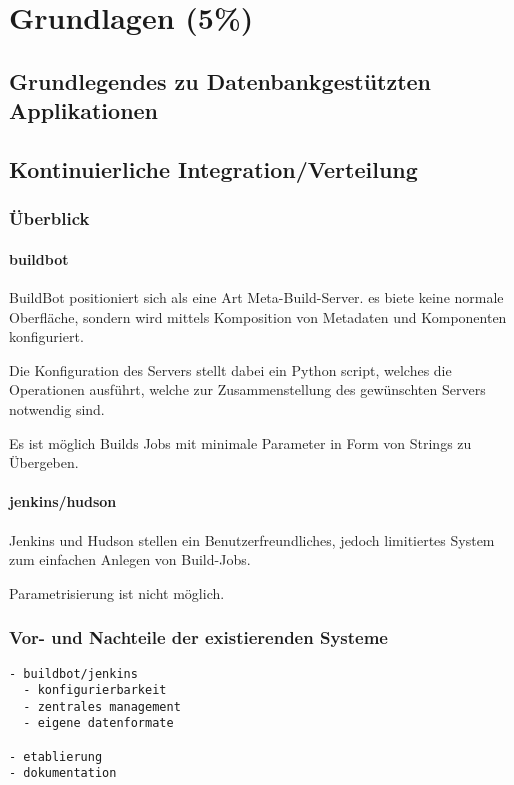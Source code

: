 \chapter{Grundlagen (5\%)}

\section{Grundlegendes zu Datenbankgest\"utzten Applikationen}
\section{Kontinuierliche Integration/Verteilung}

\subsection{Überblick}

\subsubsection{buildbot}

BuildBot positioniert sich als eine Art Meta-Build-Server.
es biete keine normale Oberfläche, sondern wird mittels
Komposition von Metadaten und Komponenten konfiguriert.

Die Konfiguration des Servers stellt dabei ein Python script,
welches die Operationen ausführt, welche zur Zusammenstellung des gewünschten Servers notwendig sind.

Es ist möglich Builds Jobs mit minimale Parameter in Form von Strings zu Übergeben.

\subsubsection{jenkins/hudson}

Jenkins und Hudson stellen ein Benutzerfreundliches,
jedoch limitiertes System zum einfachen Anlegen von Build-Jobs.

Parametrisierung ist nicht möglich.

\subsection{Vor- und Nachteile der existierenden Systeme}

\begin{verbatim}
- buildbot/jenkins
  - konfigurierbarkeit
  - zentrales management
  - eigene datenformate

- etablierung
- dokumentation
\end{verbatim}


